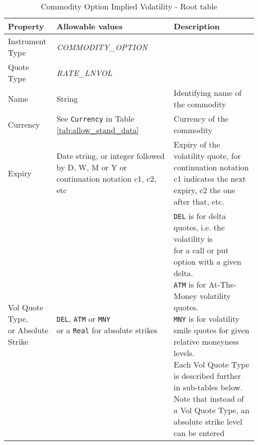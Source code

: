 \begin{table}[H]
	\centering
	\begin{tabular}{|p{3.1cm}|p{5.5cm}|p{7.7cm}|}
		\hline
		{\bf Property} & {\bf Allowable values} & {\bf Description} \\ \hline
        Instrument Type & \emph{COMMODITY\_OPTION} & \\ \hline
        Quote Type & \emph{RATE\_LNVOL} & \\ \hline
        Name & String & Identifying name of the commodity \\ \hline
        Currency & See \lstinline!Currency! in Table \ref{tab:allow_stand_data}&  Currency of the commodity \\ \hline
        Expiry & Date string, or integer followed by D, W, M or Y or continuation notation c1, c2, etc & Expiry of the volatility quote, for continuation notation c1 indicates the next expiry, c2 the one after that, etc.  \\ \hline
        \makecell[tl]{Vol Quote Type, \\ or Absolute Strike}  & \makecell[tl]{{\tt DEL}, {\tt ATM} or {\tt MNY} \\ or a {\tt Real} for absolute strikes} & \makecell[tl]{{\tt DEL} is for delta quotes, i.e. the volatility is \\ for a call or put option with a given delta. \\ {\tt ATM} is for At-The-Money volatility quotes. \\ {\tt MNY} is for volatility smile quotes for given \\ relative moneyness levels. \\ Each Vol Quote Type is described further \\ in sub-tables below.\\ Note that instead of a Vol Quote Type, an \\ absolute strike level can be entered}\\ \hline
	\end{tabular}
	\caption{Commodity Option Implied Volatility - Root table}
	\label{tab:comimplvol_quote}
\end{table}

